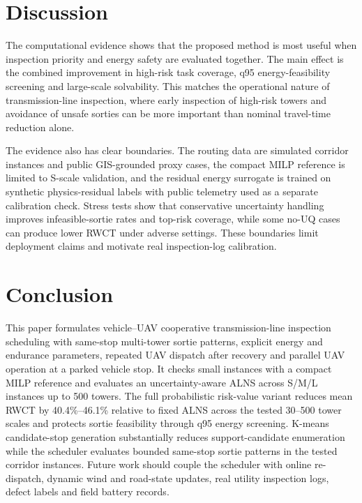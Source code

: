 \documentclass[final,5p,twocolumn,number,nopreprintline]{elsarticle}
\newcommand{\rev}[1]{{\color{blue}#1}}
\begin{document}
\clearpage

\section{Discussion}
\label{sec:discussion}

\rev{The computational evidence shows that the proposed method is most useful when inspection priority and energy safety are evaluated together. The main effect is the combined improvement in high-risk task coverage, q95 energy-feasibility screening and large-scale solvability. This matches the operational nature of transmission-line inspection, where early inspection of high-risk towers and avoidance of unsafe sorties can be more important than nominal travel-time reduction alone.}

\rev{The evidence also has clear boundaries. The routing data are simulated corridor instances and public GIS-grounded proxy cases, the compact MILP reference is limited to S-scale validation, and the residual energy surrogate is trained on synthetic physics-residual labels with public telemetry used as a separate calibration check. Stress tests show that conservative uncertainty handling improves infeasible-sortie rates and top-risk coverage, while some no-UQ cases can produce lower RWCT under adverse settings. These boundaries limit deployment claims and motivate real inspection-log calibration.}

\section{Conclusion}
\label{sec:conclusion}

\rev{This paper formulates vehicle--UAV cooperative transmission-line inspection scheduling with same-stop multi-tower sortie patterns, explicit energy and endurance parameters, repeated UAV dispatch after recovery and parallel UAV operation at a parked vehicle stop.} It checks small instances with a compact MILP reference and evaluates an uncertainty-aware ALNS across S/M/L instances up to 500 towers. \rev{The full probabilistic risk-value variant reduces mean RWCT by 40.4\%--46.1\% relative to fixed ALNS across the tested 30--500 tower scales and protects sortie feasibility through q95 energy screening.} K-means candidate-stop generation substantially reduces support-candidate enumeration while the scheduler evaluates bounded same-stop sortie patterns in the tested corridor instances. \rev{Future work should couple the scheduler with online re-dispatch, dynamic wind and road-state updates, real utility inspection logs, defect labels and field battery records.}
\end{document}
